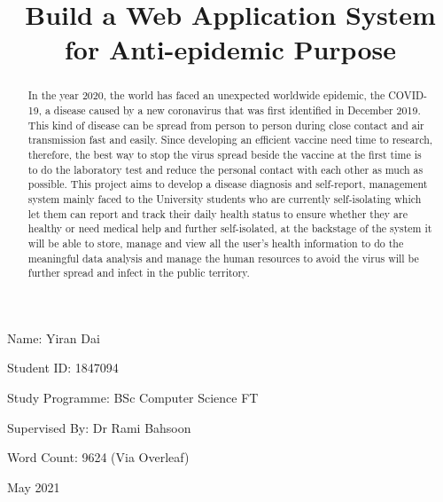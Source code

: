 \documentclass[12pt]{article}
\begin{document}
\title{Build a Web Application System for Anti-epidemic Purpose}
\date{}
\maketitle
\begin{center}
\textrm{Name: Yiran Dai}\\
\end{center}
\begin{center}
\textrm{Student ID: 1847094}\\
\end{center}
\begin{center}
\textrm{Study Programme: BSc Computer Science FT}\\
\end{center}
\begin{center}
\textrm{Supervised By: Dr Rami Bahsoon}\\
\end{center}
\begin{center}
\textrm{Word Count: 9624 (Via Overleaf)}\\
\end{center}
\parbox[t][2cm][b]{\textwidth}{
\begin{center}{\large\textrm May 2021} \end{center} }
\maketitle
\thispagestyle{empty}
\newpage
\thispagestyle{empty}
\begin{abstract}
In the year 2020, the world has faced an unexpected worldwide epidemic, the COVID-19, a disease caused by a new coronavirus that was first identified in December 2019. This kind of disease can be spread from person to person during close contact and air transmission fast and easily. Since developing an efficient vaccine need time to research, therefore, the best way to stop the virus spread beside the vaccine at the first time is to do the laboratory test and reduce the personal contact with each other as much as possible. This project aims to develop a disease diagnosis and self-report, management system mainly faced to the University students who are currently self-isolating which let them can report and track their daily health status to ensure whether they are healthy or need medical help and further self-isolated, at the backstage of the system it will be able to store, manage and view all the user’s health information to do the meaningful data analysis and manage the human resources to avoid the virus will be further spread and infect in the public territory. 
\end{abstract}
\newpage
\thispagestyle{empty}
\tableofcontents
\newpage
\setcounter{page}{1}
\end{document}
